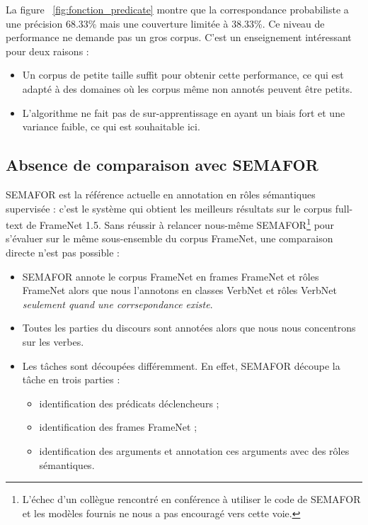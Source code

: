La figure ~\ref{fig:fonction_predicate} montre que la correspondance
probabiliste a une précision 68.33\% mais une couverture limitée à 38.33\%. Ce
niveau de performance ne demande pas un gros corpus. C'est un enseignement
intéressant pour deux raisons :

\begin{itemize}

    \item Un corpus de petite taille suffit pour obtenir cette performance, ce
    qui est adapté à des domaines où les corpus même non annotés peuvent être
    petits.

    \item L'algorithme ne fait pas de sur-apprentissage en ayant un biais fort
    et une variance faible, ce qui est souhaitable ici.

\end{itemize}

\fi

\subsection{Absence de comparaison avec SEMAFOR}

SEMAFOR \citep{das2014frame} est la référence actuelle en annotation en rôles
sémantiques supervisée : c'est le système qui obtient les meilleurs résultats
sur le corpus full-text de FrameNet 1.5. Sans réussir à relancer nous-même
SEMAFOR\footnote{L'échec d'un collègue rencontré en conférence à utiliser le
code de SEMAFOR et les modèles fournis ne nous a pas encouragé vers cette
voie.} pour s'évaluer sur le même sous-ensemble du corpus FrameNet, une
comparaison directe n'est pas possible :

\begin{itemize}
    \item SEMAFOR annote le corpus FrameNet en frames FrameNet et rôles
        FrameNet alors que nous l'annotons en classes VerbNet et rôles VerbNet
        \textit{seulement quand une corrsepondance existe}.
    \item Toutes les parties du discours sont annotées alors que nous nous
concentrons sur les verbes.
    \item Les tâches sont découpées différemment. En effet, SEMAFOR découpe la
        tâche en trois parties :
    \begin{itemize}
        \item identification des prédicats déclencheurs ;
        \item identification des frames FrameNet ;
        \item identification des arguments et annotation ces arguments avec des
            rôles sémantiques.
    \end{itemize}
\end{itemize}

